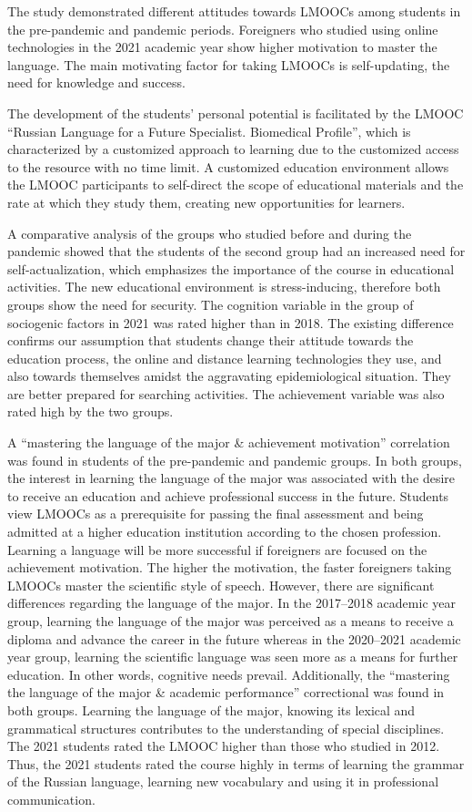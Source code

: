 \documentclass[english]{textolivre}
\begin{document}
The study demonstrated different attitudes towards LMOOCs among students in the pre-pandemic and pandemic periods. Foreigners who studied using online technologies in the 2021 academic year show higher motivation to master the language. The main motivating factor for taking LMOOCs is self-updating, the need for knowledge and success.

The development of the students’ personal potential is facilitated by the LMOOC “Russian Language for a Future Specialist. Biomedical Profile”, which is characterized by a customized approach to learning due to the customized access to the resource with no time limit. A customized education environment allows the LMOOC participants to self-direct the scope of educational materials and the rate at which they study them, creating new opportunities for learners.

A comparative analysis of the groups who studied before and during the pandemic showed that the students of the second group had an increased need for self-actualization, which emphasizes the importance of the course in educational activities. The new educational environment is stress-inducing, therefore both groups show the need for security. The cognition variable in the group of sociogenic factors in 2021 was rated higher than in 2018. The existing difference confirms our assumption that students change their attitude towards the education process, the online and distance learning technologies they use, and also towards themselves amidst the aggravating epidemiological situation. They are better prepared for searching activities. The achievement variable was also rated high by the two groups.

A “mastering the language of the major \& achievement motivation” correlation was found in students of the pre-pandemic and pandemic groups. In both groups, the interest in learning the language of the major was associated with the desire to receive an education and achieve professional success in the future. Students view LMOOCs as a prerequisite for passing the final assessment and  being admitted at a higher education institution according to the chosen profession. Learning a language will be more successful if foreigners are focused on the achievement motivation. The higher the motivation, the faster foreigners taking LMOOCs master the scientific style of speech. However, there are significant differences regarding the language of the major. In the 2017–2018 academic year group, learning the language of the major was perceived as a means to receive a diploma and advance the career in the future whereas in the 2020–2021 academic year group, learning the scientific language was seen more as a means for further education. In other words, cognitive needs prevail. Additionally, the “mastering the language of the major \& academic performance” correctional was found in both groups. Learning the language of the major, knowing its lexical and grammatical structures contributes to the understanding of special disciplines. The 2021 students rated the LMOOC higher than those who studied in 2012. Thus, the 2021 students rated the course highly in terms of learning the grammar of the Russian language, learning new vocabulary and using it in professional communication.
\end{document}
